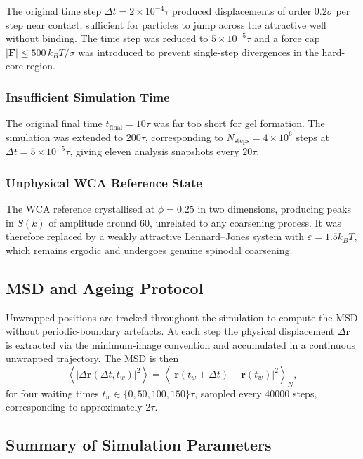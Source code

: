\documentclass[11pt,a4paper]{article}
\begin{document}
The original time step $\Delta t = 2\times10^{-4}\tau$ produced displacements of order $0.2\sigma$ per step near contact, sufficient for particles to jump across the attractive well without binding. The time step was reduced to $5\times10^{-5}\tau$ and a force cap $|\mathbf F|\leq 500\,k_B T/\sigma$ was introduced to prevent single-step divergences in the hard-core region.

\subsubsection{Insufficient Simulation Time}

The original final time $t_{\mathrm{final}}=10\tau$ was far too short for gel formation. The simulation was extended to $200\tau$, corresponding to $N_{\mathrm{steps}}=4\times10^6$ steps at $\Delta t=5\times10^{-5}\tau$, giving eleven analysis snapshots every $20\tau$.

\subsubsection{Unphysical WCA Reference State}

The WCA reference crystallised at $\phi=0.25$ in two dimensions, producing peaks in $S(k)$ of amplitude around $60$, unrelated to any coarsening process. It was therefore replaced by a weakly attractive Lennard--Jones system with $\varepsilon=1.5 k_B T$, which remains ergodic and undergoes genuine spinodal coarsening.

\subsection{MSD and Ageing Protocol}

Unwrapped positions are tracked throughout the simulation to compute the MSD without periodic-boundary artefacts. At each step the physical displacement $\Delta \mathbf r$ is extracted via the minimum-image convention and accumulated in a continuous unwrapped trajectory. The MSD is then
\begin{equation}
    \left\langle |\Delta \mathbf r(\Delta t,t_w)|^2\right\rangle
    =
    \left\langle
    \left|\mathbf r(t_w+\Delta t)-\mathbf r(t_w)\right|^2
    \right\rangle_N,
    \label{eq:msd_protocol}
\end{equation}
for four waiting times $t_w\in\{0,50,100,150\}\tau$, sampled every $40000$ steps, corresponding to approximately $2\tau$.

\subsection{Summary of Simulation Parameters}
\end{document}
